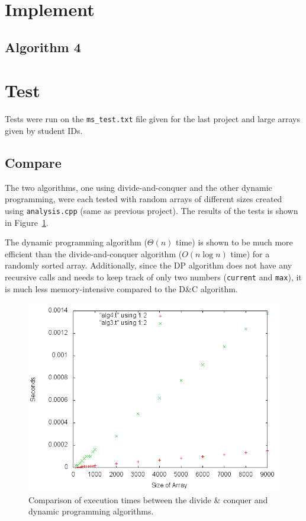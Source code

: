 \documentclass[letterpaper,10pt]{article}
\begin{document}
	\section{Implement}
		\subsection{Algorithm 4}
		


	\section{Test}
		Tests were run on the {\tt ms\_test.txt} file given for the last project and large arrays given by student IDs.


\begin{samepage}
	\section{Compare}
		The two algorithms, one using divide-and-conquer and the other dynamic programming, were each tested with random arrays of different sizes created using {\tt analysis.cpp} (same as previous project). The results of the tests is shown in Figure~\ref{fig:algcomp}.

		The dynamic programming algorithm ($\Theta(n)$ time) is shown to be much more efficient than the divide-and-conquer algorithm ($O(n \log n)$ time) for a randomly sorted array. Additionally, since the DP algorithm does not have any recursive calls and needs to keep track of only two numbers ({\tt current} and {\tt max}), it is much less memory-intensive compared to the D\&C algorithm.

		\begin{figure}[!htb]
			\centering
			\includegraphics[scale=.5]{timingfiles/algCompareplot.png}
			\caption{Comparison of execution times between the divide \& conquer and dynamic programming algorithms.}
			\label{fig:algcomp}
		\end{figure}
\end{samepage}
\end{document}
